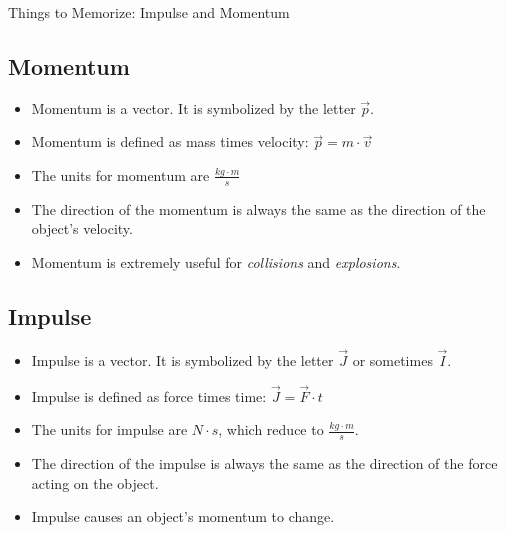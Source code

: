 \documentclass[letterpaper, 12pt]{article}
\begin{document}
	


\begin{center}Things to Memorize: Impulse and Momentum
\end{center}

\subsection*{Momentum}
\begin{itemize}
	\item Momentum is a vector.  It is symbolized by the letter $\vec{p} $.  
	\item Momentum is defined as mass times velocity: $\vec{p} = m \cdot \vec v $
	\item The units for momentum are $ \frac{kg \cdot m}{s} $
	\item The direction of the momentum is always the same as the direction of the object's velocity. 
	\item Momentum is extremely useful for \textit{collisions} and \textit{explosions}.  
	
\end{itemize}

\subsection*{Impulse}
\begin{itemize}
	\item Impulse is a vector.  It is symbolized by the letter $\vec{J}$ or sometimes $\vec{I} $.  
	\item Impulse is defined as force times time: $\vec{J} = \vec{F} \cdot  t $
\item The units for impulse are $N \cdot s $, which reduce to $ \frac{kg \cdot m}{s} $.
\item The direction of the impulse is always the same as the direction of the force acting on the object. 
\item Impulse causes an object's momentum to change.
	
	
\end{itemize}

	
\end{document}
